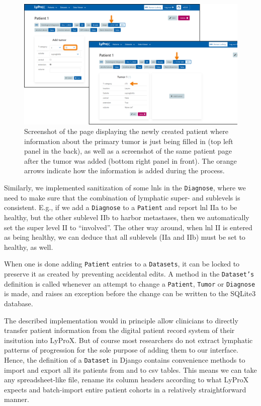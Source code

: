 \documentclass[\relativeRoot/main.tex]{subfiles}
\begin{document}
\begin{figure}
    \centering
    \includegraphics[width=1.0\textwidth]{figures/sanitize_t_stage.png}
    \caption[
        Process of adding a new tumor to a patient
    ]{
        Screenshot of the page displaying the newly created patient where information about the primary tumor is just being filled in (top left panel in the back), as well as a screenshot of the same patient page after the tumor was added (bottom right panel in front). The orange arrows indicate how the information is added during the process.
    }
    \label{fig:lyprox:sanitize_t_stage}
\end{figure}

Similarly, we implemented sanitization of some \glspl{lnl} in the \texttt{Diagnose}, where we need to make sure that the combination of lymphatic super- and sublevels is consistent. E.g., if we add a \texttt{Diagnose} to a \texttt{Patient} and report \gls{lnl} IIa to be healthy, but the other sublevel IIb to harbor metastases, then we automatically set the super level II to ``involved''. The other way around, when \gls{lnl} II is entered as being healthy, we can deduce that all sublevels (IIa and IIb) must be set to healthy, as well.

When one is done adding \texttt{Patient} entries to a \texttt{Datasets}, it can be locked to preserve it as created by preventing accidental edits. A method in the \texttt{Dataset's} definition is called whenever an attempt to change a \texttt{Patient}, \texttt{Tumor} or \texttt{Diagnose} is made, and raises an exception before the change can be written to the SQLite3 database.

The described implementation would in principle allow clinicians to directly transfer patient information from the digital patient record system of their insitution into LyProX. But of course most researchers do not extract lymphatic patterns of progression for the sole purpose of adding them to our interface. Hence, the definition of a \texttt{Dataset} in Django contains convenience methods to import and export all its patients from and to \gls{csv} tables. This means we can take any spreadsheet-like file, rename its column headers according to what LyProX expects and batch-import entire patient cohorts in a relatively straightforward manner.
\end{document}

